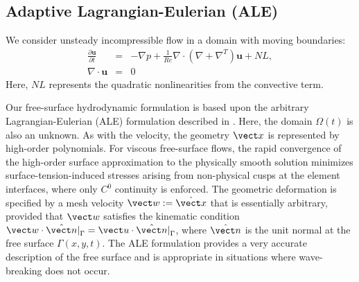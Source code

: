 
\subsection{Adaptive Lagrangian-Eulerian (ALE)}

We consider unsteady incompressible flow in a domain with moving boundaries:
\begin{eqnarray} \label{eq:mhd1}
\frac{\partial\mathbf u}{\partial t}&=&-\nabla p +\frac{1}{Re}\nabla\cdot(\nabla + \nabla^T)\mathbf u  + NL,\\
 \nabla \cdot \mathbf u &= &0 
\end{eqnarray}
Here, \(NL\) represents the quadratic nonlinearities from the convective term.

Our free-surface hydrodynamic formulation is based upon the arbitrary 
Lagrangian-Eulerian (ALE) formulation described in \cite{ho89}.
Here, the domain \(\Omega(t)\) is also an unknown.  As with the velocity,
the geometry \(\vect x\) is represented by high-order polynomials.
For viscous free-surface flows,
the rapid convergence of the high-order surface approximation to the 
physically smooth solution minimizes surface-tension-induced stresses
arising from non-physical cusps at the element interfaces, 
where only \(C^0\) continuity is enforced.  
The geometric deformation is specified by a mesh velocity \(\vect w := \dot{\vect x}\)
that is essentially arbitrary, provided that \(\vect w\) satisfies the kinematic
condition \(\vect w \cdot \hat{\vect n}|^{}_{\Gamma} = \vect u \cdot \hat{\vect n}|^{}_{\Gamma}\),
where \(\hat{\vect n}\) is the unit normal at the free surface \(\Gamma(x,y,t)\).
The ALE formulation provides a very accurate description of the free
surface and is appropriate in situations where wave-breaking does not occur.

